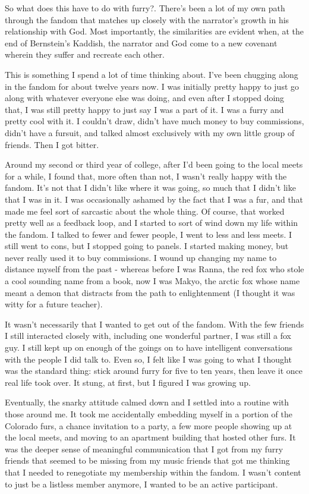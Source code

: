 So what does this have to do with furry?. There's been a lot of my own path through the fandom that matches up closely with the narrator's growth in his relationship with God. Most importantly, the similarities are evident when, at the end of Bernstein's Kaddish, the narrator and God come to a new covenant wherein they suffer and recreate each other.

This is something I spend a lot of time thinking about. I've been chugging along in the fandom for about twelve years now. I was initially pretty happy to just go along with whatever everyone else was doing, and even after I stopped doing that, I was still pretty happy to just say I was a part of it. I was a furry and pretty cool with it. I couldn't draw, didn't have much money to buy commissions, didn't have a fursuit, and talked almost exclusively with my own little group of friends. Then I got bitter.

Around my second or third year of college, after I'd been going to the local meets for a while, I found that, more often than not, I wasn't really happy with the fandom. It's not that I didn't like where it was going, so much that I didn't like that I was in it. I was occasionally ashamed by the fact that I was a fur, and that made me feel sort of sarcastic about the whole thing. Of course, that worked pretty well as a feedback loop, and I started to sort of wind down my life within the fandom. I talked to fewer and fewer people, I went to less and less meets. I still went to cons, but I stopped going to panels. I started making money, but never really used it to buy commissions. I wound up changing my name to distance myself from the past - whereas before I was Ranna, the red fox who stole a cool sounding name from a book, now I was Makyo, the arctic fox whose name meant a demon that distracts from the path to enlightenment (I thought it was witty for a future teacher).

It wasn't necessarily that I wanted to get out of the fandom. With the few friends I still interacted closely with, including one wonderful partner, I was still a fox guy. I still kept up on enough of the goings on to have intelligent conversations with the people I did talk to. Even so, I felt like I was going to what I thought was the standard thing: stick around furry for five to ten years, then leave it once real life took over. It stung, at first, but I figured I was growing up.

Eventually, the snarky attitude calmed down and I settled into a routine with those around me. It took me accidentally embedding myself in a portion of the Colorado furs, a chance invitation to a party, a few more people showing up at the local meets, and moving to an apartment building that hosted other furs. It was the deeper sense of meaningful communication that I got from my furry friends that seemed to be missing from my music friends that got me thinking that I needed to renegotiate my membership within the fandom. I wasn't content to just be a listless member anymore, I wanted to be an active participant.

